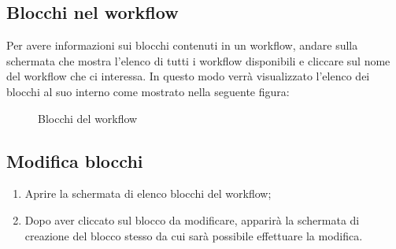 \subsection{Blocchi nel workflow}
Per avere informazioni sui blocchi contenuti in un workflow, andare sulla schermata che mostra l'elenco di tutti i workflow disponibili  e cliccare sul nome del workflow che ci interessa.
In questo modo verrà visualizzato l'elenco dei blocchi al suo interno come mostrato nella seguente figura:
\begin{figure}[!ht]
	\centering
	\caption{Blocchi del workflow}
\end{figure}
\newpage
\subsection{Modifica blocchi}
\begin{enumerate}
	\item Aprire la schermata di elenco blocchi del workflow;
	\item Dopo aver cliccato sul blocco da modificare, apparirà la schermata di creazione del blocco stesso da cui sarà possibile effettuare la modifica.
\end{enumerate}

